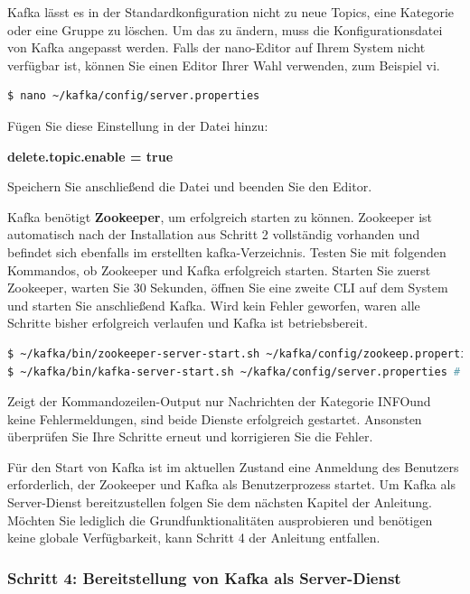 \documentclass[a4paper,titlepage,halfparskip,12pt]{scrreprt}
\begin{document}
\begin{onehalfspacing}
Kafka lässt es in der Standardkonfiguration nicht zu neue Topics, eine Kategorie oder eine Gruppe zu löschen. Um das zu ändern, muss die Konfigurationsdatei von Kafka angepasst werden. Falls der \glqq nano\grqq -Editor auf Ihrem System nicht verfügbar ist, können Sie einen Editor Ihrer Wahl verwenden, zum Beispiel \glqq vi\grqq.

\smallskip

\begin{lstlisting}[language=Bash]
$ nano ~/kafka/config/server.properties
\end{lstlisting}

Fügen Sie diese Einstellung in der Datei hinzu:

\textbf{delete.topic.enable = true}

Speichern Sie anschließend die Datei und beenden Sie den Editor.

Kafka benötigt \textbf{Zookeeper}, um erfolgreich starten zu können. Zookeeper ist automatisch nach der Installation aus Schritt 2 vollständig vorhanden und befindet sich ebenfalls im erstellten \glqq kafka\grqq -Verzeichnis. Testen Sie mit folgenden Kommandos, ob Zookeeper und Kafka erfolgreich starten. Starten Sie zuerst Zookeeper, warten Sie 30 Sekunden, öffnen Sie eine zweite CLI auf dem System und starten Sie anschließend Kafka. Wird kein Fehler geworfen, waren alle Schritte bisher erfolgreich verlaufen und Kafka ist betriebsbereit.

\smallskip

\begin{lstlisting}[language=Bash]
$ ~/kafka/bin/zookeeper-server-start.sh ~/kafka/config/zookeep.properties # Start: zookeeper
$ ~/kafka/bin/kafka-server-start.sh ~/kafka/config/server.properties # Start: kafka
\end{lstlisting}

Zeigt der Kommandozeilen-Output nur Nachrichten der Kategorie \glqq INFO\grqq und keine Fehlermeldungen, sind beide Dienste erfolgreich gestartet. Ansonsten überprüfen Sie Ihre Schritte erneut und korrigieren Sie die Fehler.

Für den Start von Kafka ist im aktuellen Zustand eine Anmeldung des Benutzers erforderlich, der Zookeeper und Kafka als Benutzerprozess startet. Um Kafka als Server-Dienst bereitzustellen folgen Sie dem nächsten Kapitel der Anleitung. Möchten Sie lediglich die Grundfunktionalitäten ausprobieren und benötigen keine globale Verfügbarkeit, kann Schritt 4 der Anleitung entfallen.

\subsubsection*{Schritt 4: Bereitstellung von Kafka als Server-Dienst}


\end{onehalfspacing}
\end{document}
